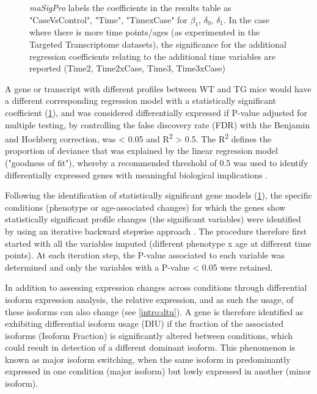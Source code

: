 \begin{figure}[!htp]
{	\textit{maSigPro} labels the coefficients in the results table as "CaseVsControl", "Time", "TimexCase" for $\beta_{1}$, $\delta_{0}$, $\delta_{1}$. In the case where there is more time points/ages (as experimented in the Targeted Transcriptome datasets), the significance for the additional regression coefficients relating to the additional time variables are reported (Time2, Time2xCase, Time3, Time3xCase)}   
	\label{fig:dea_model}
\end{figure}

A gene or transcript with different profiles between WT and TG mice would have a different corresponding regression model with a statistically significant coefficient (\cref{fig:dea_model}), and was considered differentially expressed if P-value adjusted for multiple testing, by controlling the false discovery rate (FDR) with the Benjamin and Hochberg correction, was < 0.05 and R\textsuperscript{2} > 0.5. The R\textsuperscript{2} defines the proportion of deviance that was explained by the linear regression model ("goodness of fit"), whereby a recommended threshold of 0.5 was used to identify differentially expressed genes with meaningful biological implications \cite{Conesa2006}.

Following the identification of statistically significant gene models (\cref{fig:dea_model}), the specific conditions (phenotype or age-associated changes) for which the genes show statistically significant profile changes (the significant variables) were identified by using an iterative backward stepwise approach \cite{Conesa2017}. The procedure therefore first started with all the variables imputed (different phenotype x age at different time points). At each iteration step, the P-value associated to each variable was determined and only the variables with a P-value < 0.05 were retained. 

\label{ch:diu_method}
In addition to assessing expression changes across conditions through differential isoform expression analysis, the relative expression, and as such the usage, of these isoforms can also change (see \cref{intro:dtu}). A gene is therefore identified as exhibiting differential isoform usage (DIU) if the fraction of the associated isoforms (Isoform Fraction) is significantly altered between conditions, which could result in detection of a different dominant isoform. This phenomenon is known as major isoform switching, when the same isoform in predominantly expressed in one condition (major isoform) but lowly expressed in another (minor isoform). 


